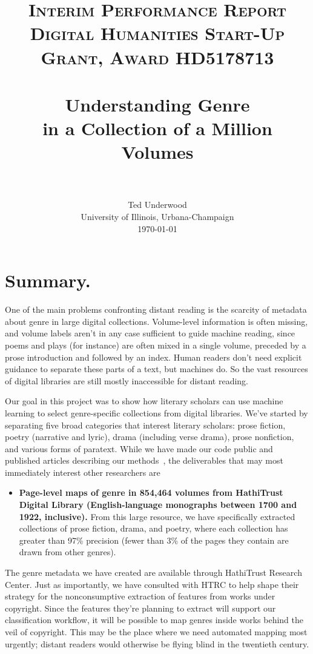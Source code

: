 \documentclass[paper=a4, fontsize=12pt]{scrartcl}
\title{
		\usefont{OT1}{bch}{b}{n}
		\normalfont \normalsize \textsc{Interim Performance Report\\Digital Humanities Start-Up Grant, Award HD5178713} \\ [25pt]
		\horrule{0.5pt} \\[0.4cm]
		\huge Understanding Genre\\in a Collection of a Million Volumes \\
		\horrule{2pt} \\[0.5cm]
}
\author{
        Ted Underwood\\University of Illinois, Urbana-Champaign\\	
        \today
}
\date{}
\numberwithin{equation}{section}		%
\numberwithin{figure}{section}			%
\numberwithin{table}{section}				%
\begin{document}
\maketitle
\thispagestyle{empty}
\newpage
\setcounter{page}{1}
\normalsize
{}
\tableofcontents
\newpage
\section{Summary.} 
One of the main problems confronting distant reading is the scarcity of metadata about genre in large digital collections. Volume-level information is often missing, and volume labels aren't in any case sufficient to guide machine reading, since poems and plays (for instance) are often mixed in a single volume, preceded by a prose introduction and followed by an index. Human readers don't need explicit guidance to separate these parts of a text, but machines do. So the vast resources of digital libraries are still mostly inaccessible for distant reading.

Our goal in this project was to show how literary scholars can use machine learning to select genre-specific collections from digital libraries. We've started by separating five broad categories that interest literary scholars: prose fiction, poetry (narrative and lyric), drama (including verse drama), prose nonfiction, and various forms of paratext. While we have made our code public and published articles describing our methods~\cite{underwood:mutable, underwood:blurry, underwood:slate, underwood:genrerepo}, the deliverables that may most immediately interest other researchers are
\begin{itemize}
\item \textbf{Page-level maps of genre in 854,464 volumes from HathiTrust Digital Library (English-language monographs between 1700 and 1922, inclusive).} From this large resource, we have specifically extracted collections of prose fiction, drama, and poetry, where each collection has greater than 97\% precision (fewer than 3\% of the pages they contain are drawn from other genres).
\end{itemize}

The genre metadata we have created are available through HathiTrust Research Center. Just as importantly, we have consulted with HTRC to help shape their strategy for the nonconsumptive extraction of features from works under copyright. Since the features they're planning to extract will support our classification workflow, it will be possible to map genres inside works behind the veil of copyright. This may be the place where we need automated mapping most urgently; distant readers would otherwise be flying blind in the twentieth century.
\end{document}
